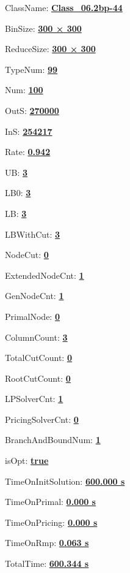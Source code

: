 \documentclass[11pt]{article}
\begin{document}
\pagestyle{empty}


ClassName: \underline{\textbf{Class_06.2bp-44}}
\par
BinSize: \underline{\textbf{300 × 300}}
\par
ReduceSize: \underline{\textbf{300 × 300}}
\par
TypeNum: \underline{\textbf{99}}
\par
Num: \underline{\textbf{100}}
\par
OutS: \underline{\textbf{270000}}
\par
InS: \underline{\textbf{254217}}
\par
Rate: \underline{\textbf{0.942}}
\par
UB: \underline{\textbf{3}}
\par
LB0: \underline{\textbf{3}}
\par
LB: \underline{\textbf{3}}
\par
LBWithCut: \underline{\textbf{3}}
\par
NodeCut: \underline{\textbf{0}}
\par
ExtendedNodeCnt: \underline{\textbf{1}}
\par
GenNodeCnt: \underline{\textbf{1}}
\par
PrimalNode: \underline{\textbf{0}}
\par
ColumnCount: \underline{\textbf{3}}
\par
TotalCutCount: \underline{\textbf{0}}
\par
RootCutCount: \underline{\textbf{0}}
\par
LPSolverCnt: \underline{\textbf{1}}
\par
PricingSolverCnt: \underline{\textbf{0}}
\par
BranchAndBoundNum: \underline{\textbf{1}}
\par
isOpt: \underline{\textbf{true}}
\par
TimeOnInitSolution: \underline{\textbf{600.000 s}}
\par
TimeOnPrimal: \underline{\textbf{0.000 s}}
\par
TimeOnPricing: \underline{\textbf{0.000 s}}
\par
TimeOnRmp: \underline{\textbf{0.063 s}}
\par
TotalTime: \underline{\textbf{600.344 s}}
\par
\newpage
\end{document}
